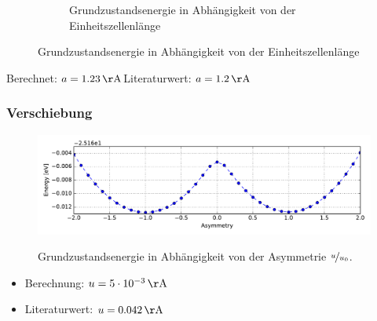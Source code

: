 \begin{frame}
\begin{figure}[]
\begin{subfigure}{0.45\textwidth}
		\captionsetup{justification = centering}
		\caption{Grundzustandsenergie in Abhängigkeit von der Einheitszellenlänge}
		\label{image_poly_cell_len}
	\end{subfigure}
\end{figure}

Berechnet: $a = \unit[1.23]{\AA}$\hfill Literaturwert: $a = \unit[1.2]{\AA}$
\end{frame}

\begin{frame}
\frametitle{Verschiebung}
\begin{figure}
\centering
\centering
\includegraphics[width = \textwidth]{Images/polyacetylene/convergence/Potential_with_asymmetry}
\label{image_potential_with_asymmetry}
\caption{Grundzustandsenergie in Abhängigkeit von der Asymmetrie $\nicefrac{u}{u_0}$.}
\end{figure}
\begin{itemize}
\item Berechnung: $u = \unit[5\cdot10^{-3}]{\AA}$
\item Literaturwert: $u = \unit[0.042]{\AA}$
\end{itemize}
\end{frame}

